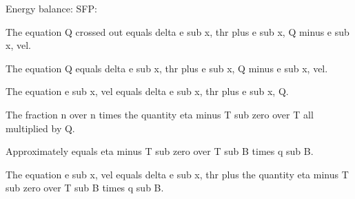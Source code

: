 Energy balance: SFP:

The equation Q crossed out equals delta e sub x, thr plus e sub x, Q minus e sub x, vel.

The equation Q equals delta e sub x, thr plus e sub x, Q minus e sub x, vel.

The equation e sub x, vel equals delta e sub x, thr plus e sub x, Q.

The fraction n over n times the quantity eta minus T sub zero over T all multiplied by Q.

Approximately equals eta minus T sub zero over T sub B times q sub B.

The equation e sub x, vel equals delta e sub x, thr plus the quantity eta minus T sub zero over T sub B times q sub B.